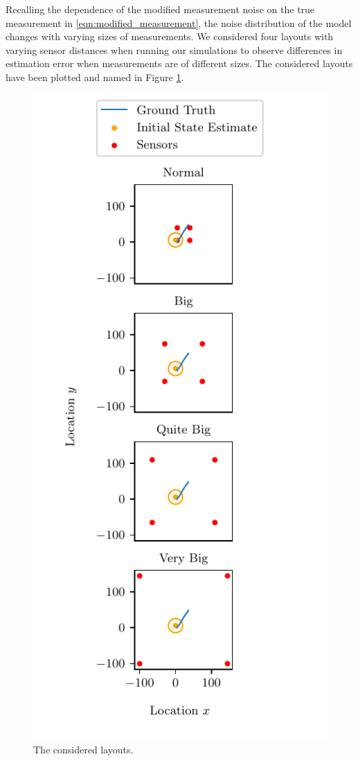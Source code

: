 \documentclass[10pt,journal,compsoc]{IEEEtran}
\theoremstyle{definition}
\theoremstyle{definition}
\theoremstyle{remark}
\begin{document}
Recalling the dependence of the modified measurement noise on the true measurement in \eqref{eqn:modified_measurement}, the noise distribution of the model changes with varying sizes of measurements. We considered four layouts with varying sensor distances when running our simulations to observe differences in estimation error when measurements are of different sizes. The considered layouts have been plotted and named in Figure \ref{fig:sim_layouts}.
\begin{figure}[htbp]
\centering
\includegraphics{images/layouts.pdf}
\caption{The considered layouts.}
\label{fig:sim_layouts}
\end{figure}
\end{document}
